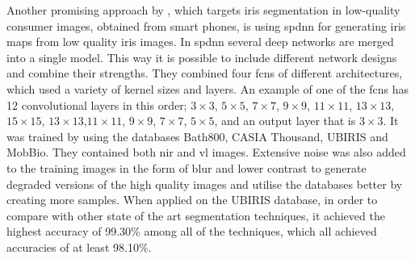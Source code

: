 Another promising approach by \cite{Bazrafkan2017}, which targets iris segmentation in low-quality consumer images, obtained from smart phones, is using \gls{spdnn} for generating iris maps from low quality iris images.  In \gls{spdnn} several deep networks are merged into a single model. This way it is possible to include different network designs and combine their strengths. They combined four \gls{fcn}s of different architectures, which used a variety of kernel sizes and layers. An example of one of the \gls{fcn}s has 12 convolutional layers in this order; $3\times3$, $5\times5$, $7\times7$, $9\times9$, $11\times11$, $13\times13$, $15\times15$, $13\times13$,$11\times11$, $9\times9$, $7\times7$, $5\times5$, and an output layer that is $3\times3$. It was trained by using the databases Bath800, CASIA Thousand, UBIRIS and MobBio. They contained both \gls{nir} and \gls{vl} images. Extensive noise was also added to the training images in the form of blur and lower contrast to generate degraded versions of the high quality images and utilise the databases better by creating more samples. When applied on the UBIRIS database, in order to compare with other state of the art segmentation techniques, it achieved the highest accuracy of 99.30\% among all of the techniques, which all achieved accuracies of at least 98.10\%.   











